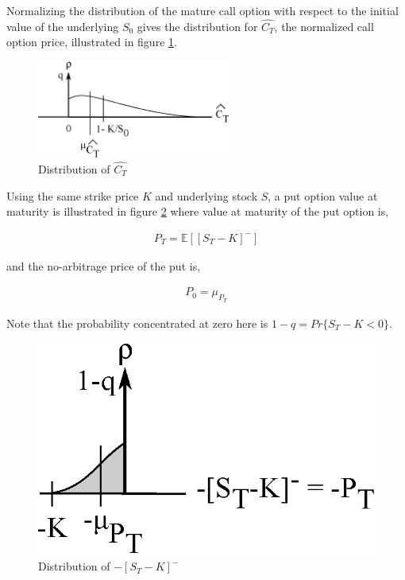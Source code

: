 Normalizing the distribution of the mature call option with respect to the initial value of the underlying $S_0$ gives the distribution for $\hat{C_T}$, the normalized call option price, illustrated in figure \ref{fig:C_T_hat}.

\begin{figure}
  \centering
  \includegraphics[width=2.5in]{Images/C_T_hat.eps}
  \caption[Distribution of Normalized Mature Call]
          {Distribution of $\hat{C_T}$}
  \label{fig:C_T_hat}
\end{figure}

Using the same strike price $K$ and underlying stock $S$, a put option value at maturity is illustrated in figure \ref{fig:S_T_minus_K_minus} where value at maturity of the put option is,

\begin{align*}
P_T = \mathbb{E}[[S_T - K]^-]
\end{align*}

and the no-arbitrage price of the put is,

\begin{align*}
P_0 = \mu_{P_T}
\end{align*}

Note that the probability concentrated at zero here is $1-q = Pr\{S_T - K < 0\}$.

\begin{figure}
  \centering
  \includegraphics{Images/S_T_minus_K_minus.eps}
  \caption[Distribution of Negative Portion of $S_T$ Minus Strike Price $K$]
          {Distribution of $-[S_T - K]^-$}
  \label{fig:S_T_minus_K_minus}
\end{figure}

